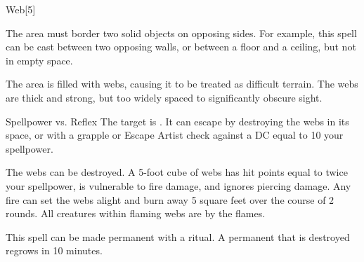 \begin{spellsection}{Web}[5]
    \begin{spellheader}
    \end{spellheader}
    \begin{spellcontent}
        \begin{spelltargetinginfo}
            \spellspecial The area must border two solid objects on opposing sides. For example, this spell can be cast between two opposing walls, or between a floor and a ceiling, but not in empty space.
        \end{spelltargetinginfo}
        \begin{spelleffects}
            \spelleffect The area is filled with webs, causing it to be treated as difficult terrain. The webs are thick and strong, but too widely spaced to significantly obscure sight. %
            \spelldur \durshort \dismissable
        \end{spelleffects}
    \end{spellcontent}
    \begin{spellsubcontent}
        \begin{spelltargetinginfo}
        \end{spelltargetinginfo}
        \begin{spelleffects}
            \begin{spellattack}{Spellpower vs. Reflex}
                \spellsuccess The target is \immobilized. It can escape by destroying the webs in its space, or with a grapple or Escape Artist check against a DC equal to 10 \add your spellpower.
            \end{spellattack}
        \end{spelleffects}
    \end{spellsubcontent}
    \begin{spellfooter}
        \spellnotes The webs can be destroyed. A 5-foot cube of webs has hit points equal to twice your spellpower, is vulnerable to fire damage, and ignores piercing damage. Any fire can set the webs alight and burn away 5 square feet over the course of 2 rounds. All creatures within flaming webs are \ignited by the flames.

        \physicalspellnotes

        This spell can be made permanent with a  ritual. A permanent  that is destroyed regrows in 10 minutes.
        \miscastyou
    \end{spellfooter}
\end{spellsection}


